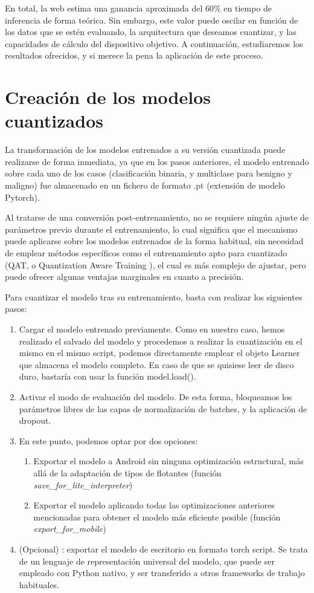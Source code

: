 En total, la web  \cite{pmobile} estima una ganancia aproximada del 60\% en tiempo de inferencia de forma teórica. Sin embargo, este valor puede oscilar en función de los datos que se estén evaluando, la arquitectura que deseamos cuantizar, y las capacidades de cálculo del dispositivo objetivo. A continuación, estudiaremos los resultados ofrecidos, y si merece la pena la aplicación de este proceso.

\section{Creación de los modelos cuantizados}

La transformación de los modelos entrenados a su versión cuantizada puede realizarse de forma inmediata, ya que en los pasos anteriores, el modelo entrenado sobre cada uno de los casos (clasificación binaria, y multiclase para benigno y maligno) fue almacenado en un fichero de formato .pt (extensión de modelo Pytorch).

Al tratarse de una conversión post-entrenamiento, no se requiere ningún ajuste de parámetros previo durante el entrenamiento, lo cual significa que el mecanismo puede aplicarse sobre los modelos entrenados de la forma habitual, sin necesidad de emplear métodos específicos como el entrenamiento apto para cuantizado (QAT, o Quantization Aware Training  \cite{kuzmin2024fp8}), el cual es más complejo de ajustar, pero puede ofrecer algunas ventajas marginales en cuanto a precisión.

Para cuantizar el modelo tras su entrenamiento, basta con realizar los siguientes pasos:
\begin{enumerate}
	\item Cargar el modelo entrenado previamente. Como en nuestro caso, hemos realizado el salvado del modelo y procedemos a realizar la cuantización en el mismo en el mismo script, podemos directamente emplear el objeto Learner que almacena el modelo completo. En caso de que se quisiese leer de disco duro, bastaría con usar la función model.load().
	\item Activar el modo de evaluación del modelo. De esta forma, bloqueamos los parámetros libres de las capas de normalización de batches, y la aplicación de dropout.
	\item En este punto, podemos optar por dos opciones:
	\begin{enumerate}
		\item Exportar el modelo a Android sin ninguna optimización estructural, más allá de la adaptación de tipos de flotantes (función \textit{save\_for\_lite\_interpreter})
		\item Exportar el modelo aplicando todas las optimizaciones anteriores mencionadas para obtener el modelo más eficiente posible (función \textit{export\_for\_mobile})
	\end{enumerate}
	\item (Opcional) : exportar el modelo de escritorio en formato torch script. Se trata de un lenguaje de representación universal del modelo, que puede ser empleado con Python nativo, y ser transferido a otros frameworks de trabajo habituales.
		
\end{enumerate}

